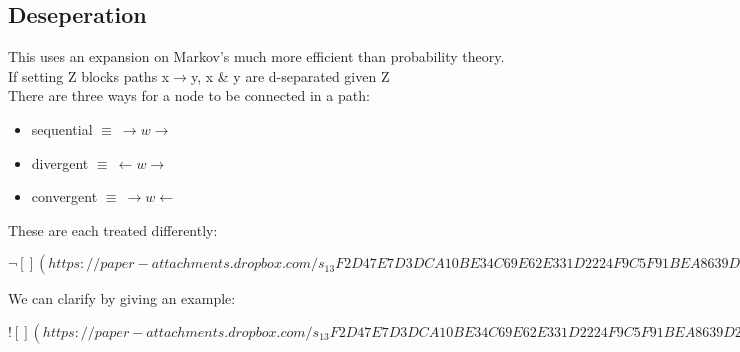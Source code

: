 \documentclass[../../lecture_notes.tex]{subfiles}
\begin{document}
\subsection*{Deseperation}
\noindent This uses an expansion on Markov’s much more efficient than probability theory.\\
If setting Z blocks paths x$\rightarrow$y, x \& y are d-separated given Z\\
There are three ways for a node to be connected in a path:
\begin{itemize} [itemsep=0mm]
	\item sequential $\equiv\ \rightarrow w \rightarrow$
	\item divergent $\equiv\ \leftarrow w \rightarrow$
	\item convergent $\equiv\ \rightarrow w \leftarrow$
\end{itemize}
\noindent These are each treated differently:

\newpage
$\neg[](https://paper-attachments.dropbox.com/s_13F2D47E7D3DCA10BE34C69E62E331D2224F9C5F91BEA8639D242F2792B86517_1590118451755_Untitled+drawing+2.jpg)$
\newpage

\noindent We can clarify by giving an example:

\newpage
$![](https://paper-attachments.dropbox.com/s_13F2D47E7D3DCA10BE34C69E62E331D2224F9C5F91BEA8639D242F2792B86517_1590119210337_Untitled+drawing+4.jpg)$
\newpage
\end{document}
